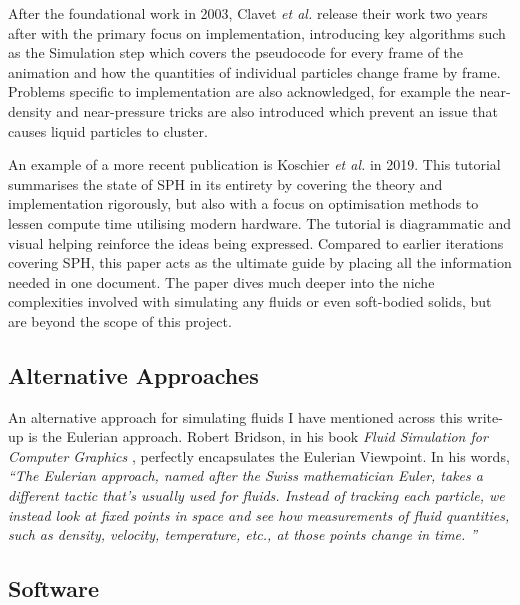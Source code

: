 \documentclass[write-up.tex]{subfiles}
\begin{document}
After the foundational work in 2003, Clavet \textit{et al.} \cite{clavet} release their work two years after with the primary focus on implementation, introducing key algorithms such as the Simulation step which covers the pseudocode for every frame of the animation and how the quantities of individual particles change frame by frame. Problems specific to implementation are also acknowledged, for example the near-density and near-pressure tricks are also introduced which prevent an issue that causes liquid particles to cluster.%

An example of a more recent publication is Koschier \textit{et al.} \cite{koschier} in 2019. This tutorial summarises the state of SPH in its entirety by covering the theory and implementation rigorously, but also with a focus on optimisation methods to lessen compute time utilising modern hardware. The tutorial is diagrammatic and visual helping reinforce the ideas being expressed. Compared to earlier iterations covering SPH, this paper acts as the ultimate guide by placing all the information needed in one document. The paper dives much deeper into the niche complexities involved with simulating any fluids or even soft-bodied solids, but are beyond the scope of this project.%

\subsection{Alternative Approaches}
An alternative approach for simulating fluids I have mentioned across this write-up is the Eulerian approach. Robert Bridson, in his book \textit{Fluid Simulation for Computer Graphics} \cite{bridson}, perfectly encapsulates the Eulerian Viewpoint. In his words, \textit{``The Eulerian approach, named after the Swiss mathematician Euler, takes a different tactic that’s usually used for fluids. Instead of tracking each particle, we instead look at fixed points in space and see how measurements of fluid quantities, such as density, velocity, temperature, etc., at those points change in time. ''}

\subsection{Software}
\end{document}
